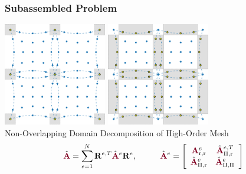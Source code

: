 \documentclass{beamer}
\begin{document}
\begin{frame}
\begin{center}
\frametitle{Subassembled Problem}

\includegraphics[height=4.5cm]{../img/HighOrderBDDCMeshPrimal}
\hspace{10mm}
\includegraphics[height=4.5cm]{../img/HighOrderBDDCMeshInterfaceBroken}\\
{\small Non-Overlapping Domain Decomposition of High-Order Mesh}\\

\begin{equation}
\hat{\color{burgundy}\mathbf{A}} = \sum_{e = 1}^N \mathbf{R}^{e, T} \hat{\color{burgundy}\mathbf{A}}^e \mathbf{R}^e, \hspace{10mm}
\hat{\color{burgundy}\mathbf{A}}^e =
\left[ \begin{array}{c c}
{\color{burgundy}\mathbf{A}}_{\text{r}, \text{r}}^e  &  \hat{\color{burgundy}\mathbf{A}}_{\Pi, \text{r}}^{e, T}  \\
\hat{\color{burgundy}\mathbf{A}}_{\Pi, \text{r}}^e   &  \hat{\color{burgundy}\mathbf{A}}_{\Pi, \Pi}^e            \\
\end{array} \right]
\end{equation}

\end{center}
\end{frame}

\end{document}
